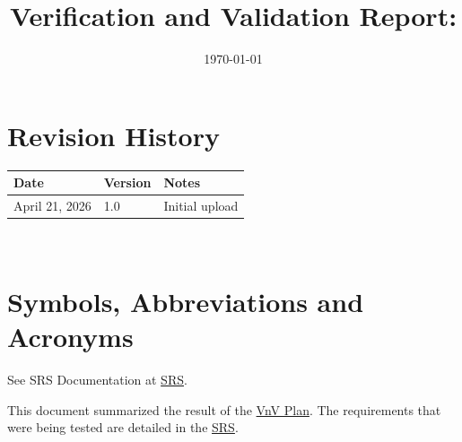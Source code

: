 \documentclass[12pt, titlepage]{article}
\begin{document}
\title{Verification and Validation Report: \progname} 
\author{\authname}
\date{\today}
	
\maketitle


\section{Revision History}

\begin{tabularx}{\textwidth}{p{3cm}p{2cm}X}
\toprule {\bf Date} & {\bf Version} & {\bf Notes}\\
\midrule
April 21, 2026 & 1.0 & Initial upload\\
\bottomrule
\end{tabularx}

~\newpage

\section{Symbols, Abbreviations and Acronyms}

See SRS Documentation at \href{https://krozix-2026.github.io/cas741-speech-trf/SRS/SRS.pdf}{SRS}.



\newpage

\tableofcontents

\listoftables %

\listoffigures %

\newpage


This document summarized the result of the 
\href{https://krozix-2026.github.io/cas741-speech-trf/VnVPlan/VnVPlan.pdf}{VnV Plan}. 
The requirements that were being tested are detailed in the 
\href{https://krozix-2026.github.io/cas741-speech-trf/SRS/SRS.pdf}{SRS}.
\end{document}
